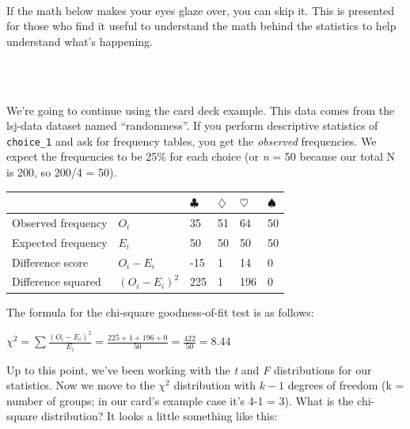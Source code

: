 \documentclass[
]{book}
\newenvironment{info}
    {
    \hline\\
    }
    { 
    \\\\\hline
    }
\begin{document}
\begin{info}
If the math below makes your eyes glaze over, you can skip it. This is
presented for those who find it useful to understand the math behind the
statistics to help understand what's happening.
\end{info}

We're going to continue using the card deck example. This data comes from the lsj-data dataset named ``randomness''. If you perform descriptive statistics of \texttt{choice\_1} and ask for frequency tables, you get the \emph{observed} frequencies. We expect the frequencies to be 25\% for each choice (or \emph{n} = 50 because our total N is 200, so 200/4 = 50).

\begin{longtable}[]{@{}llllll@{}}
\toprule
& & \(\clubsuit\) & \(\diamondsuit\) & \(\heartsuit\) & \(\spadesuit\)\tabularnewline
\midrule
\endhead
Observed frequency & \(O_i\) & 35 & 51 & 64 & 50\tabularnewline
Expected frequency & \(E_i\) & 50 & 50 & 50 & 50\tabularnewline
Difference score & \(O_i-E_i\) & -15 & 1 & 14 & 0\tabularnewline
Difference squared & \((O_i-E_i)^2\) & 225 & 1 & 196 & 0\tabularnewline
\bottomrule
\end{longtable}

The formula for the chi-square goodness-of-fit test is as follows:

\(\chi^2 = \sum{\frac{(O_i-E_i)^2}{E_i}} = \frac{225 + 1 + 196 + 0}{50} = \frac{422}{50} = 8.44\)

Up to this point, we've been working with the \emph{t} and \emph{F} distributions for our statistics. Now we move to the \(\chi^2\) distribution with \(k-1\) degrees of freedom (k = number of groups; in our card's example case it's 4-1 = 3). What is the chi-square distribution? It looks a little something like this:
\end{document}
